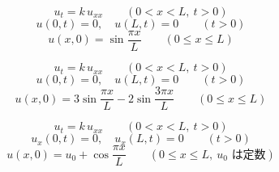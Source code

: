 \documentclass[a4paper,11pt]{article}
\begin{document}


\[
u_t = k\,u_{xx} \qquad (0 < x < L,\ t > 0)
\]
\[
u(0,t) = 0,\quad u(L,t) = 0 \qquad (t > 0)
\]
\[
u(x,0) = \sin\frac{\pi x}{L} \qquad (0 \le x \le L)
\]

\[
u_t = k\,u_{xx} \qquad (0 < x < L,\ t > 0)
\]
\[
u(0,t) = 0,\quad u(L,t) = 0 \qquad (t > 0)
\]
\[
u(x,0) = 3\sin\frac{\pi x}{L} - 2\sin\frac{3\pi x}{L} \qquad (0 \le x \le L)
\]

\[
u_t = k\,u_{xx} \qquad (0 < x < L,\ t > 0)
\]
\[
u_x(0,t) = 0,\quad u_x(L,t) = 0 \qquad (t > 0)
\]
\[
u(x,0) = u_0 + \cos\frac{\pi x}{L} \qquad (0 \le x \le L,\ u_0 \text{ は定数})
\]
\end{document}
